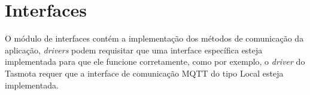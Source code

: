 \section{Interfaces}
\label{opus-sec:interfaces}

O módulo de interfaces contém a implementação dos métodos de comunicação da aplicação, \emph{drivers} podem requisitar que
uma interface específica esteja implementada para que ele funcione corretamente, como por exemplo, o \emph{driver} do Tasmota
requer que a interface de comunicação MQTT do tipo Local esteja implementada.